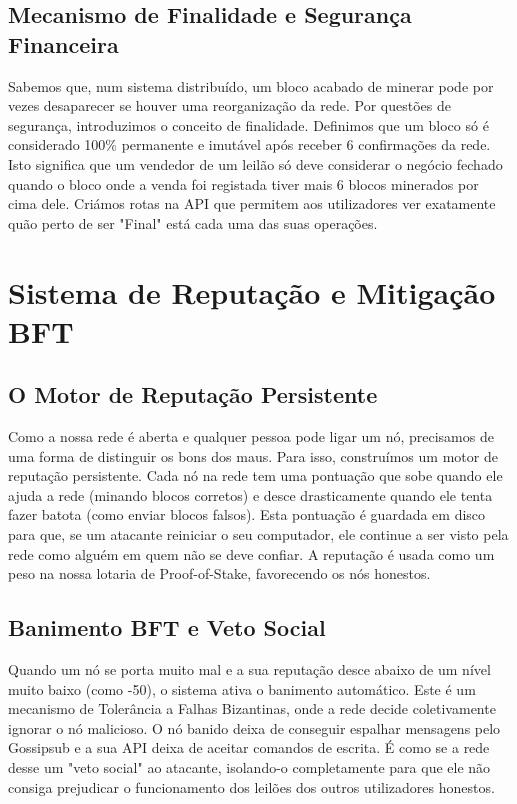 \documentclass[11pt]{article}
\begin{document}
\subsection{Mecanismo de Finalidade e Segurança Financeira}
Sabemos que, num sistema distribuído, um bloco acabado de minerar pode por vezes desaparecer se houver uma reorganização da rede. Por questões de segurança, introduzimos o conceito de finalidade. Definimos que um bloco só é considerado 100\% permanente e imutável após receber 6 confirmações da rede. Isto significa que um vendedor de um leilão só deve considerar o negócio fechado quando o bloco onde a venda foi registada tiver mais 6 blocos minerados por cima dele. Criámos rotas na API que permitem aos utilizadores ver exatamente quão perto de ser "Final" está cada uma das suas operações.

\section{Sistema de Reputação e Mitigação BFT}

\subsection{O Motor de Reputação Persistente}
Como a nossa rede é aberta e qualquer pessoa pode ligar um nó, precisamos de uma forma de distinguir os bons dos maus. Para isso, construímos um motor de reputação persistente. Cada nó na rede tem uma pontuação que sobe quando ele ajuda a rede (minando blocos corretos) e desce drasticamente quando ele tenta fazer batota (como enviar blocos falsos). Esta pontuação é guardada em disco para que, se um atacante reiniciar o seu computador, ele continue a ser visto pela rede como alguém em quem não se deve confiar. A reputação é usada como um peso na nossa lotaria de Proof-of-Stake, favorecendo os nós honestos.

\subsection{Banimento BFT e Veto Social}
Quando um nó se porta muito mal e a sua reputação desce abaixo de um nível muito baixo (como -50), o sistema ativa o banimento automático. Este é um mecanismo de Tolerância a Falhas Bizantinas, onde a rede decide coletivamente ignorar o nó malicioso. O nó banido deixa de conseguir espalhar mensagens pelo Gossipsub e a sua API deixa de aceitar comandos de escrita. É como se a rede desse um "veto social" ao atacante, isolando-o completamente para que ele não consiga prejudicar o funcionamento dos leilões dos outros utilizadores honestos.
\end{document}
